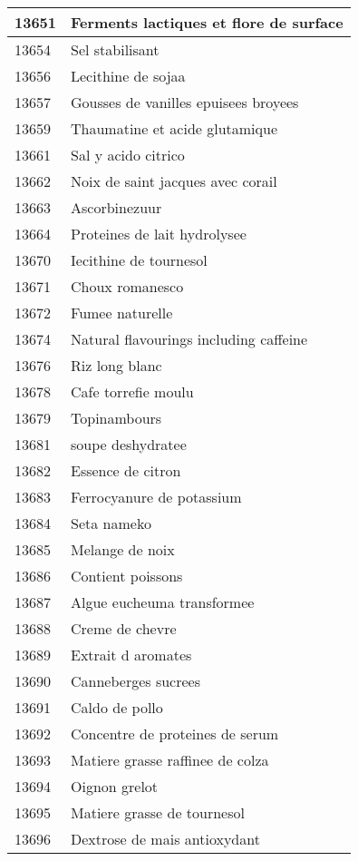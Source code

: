 \begin{longtable}{|l|l|}
13651 & Ferments lactiques et flore de surface \\ \hline 
13654 & Sel stabilisant \\ \hline 
13656 & Lecithine de sojaa \\ \hline 
13657 & Gousses de vanilles epuisees broyees \\ \hline 
13659 & Thaumatine et acide glutamique \\ \hline 
13661 & Sal y acido citrico \\ \hline 
13662 & Noix de saint jacques avec corail \\ \hline 
13663 & Ascorbinezuur \\ \hline 
13664 & Proteines de lait hydrolysee \\ \hline 
13670 & Iecithine de tournesol \\ \hline 
13671 & Choux romanesco \\ \hline 
13672 & Fumee naturelle \\ \hline 
13674 & Natural flavourings including caffeine \\ \hline 
13676 & Riz long blanc \\ \hline 
13678 & Cafe torrefie moulu \\ \hline 
13679 & Topinambours \\ \hline 
13681 & soupe deshydratee \\ \hline 
13682 & Essence de citron \\ \hline 
13683 & Ferrocyanure de potassium \\ \hline 
13684 & Seta nameko \\ \hline 
13685 & Melange de noix \\ \hline 
13686 & Contient poissons \\ \hline 
13687 & Algue eucheuma transformee \\ \hline 
13688 & Creme de chevre \\ \hline 
13689 & Extrait d aromates \\ \hline 
13690 & Canneberges sucrees \\ \hline 
13691 & Caldo de pollo \\ \hline 
13692 & Concentre de proteines de serum \\ \hline 
13693 & Matiere grasse raffinee de colza \\ \hline 
13694 & Oignon grelot \\ \hline 
13695 & Matiere grasse de tournesol \\ \hline 
13696 & Dextrose de mais antioxydant \\ \hline 

\end{longtable}
